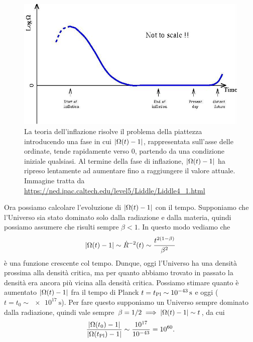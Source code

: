 \begin{figure}
  \centering
  \includegraphics[width=\textwidth]{figure/flatness}
  \caption[Come l'inflazione risolve il problema della piattezza]{La teoria
    dell'inflazione risolve il problema della piattezza introducendo una fase in
    cui \(\lvert\Omega(t) - 1\rvert\), rappresentata sull'asse delle ordinate, tende
    rapidamente verso \(0\), partendo da una condizione iniziale qualsiasi.  Al
    termine della fase di inflazione, \(\lvert\Omega(t) - 1\rvert\) ha ripreso
    lentamente ad aumentare fino a raggiungere il valore attuale.  Immagine
    tratta da \url{https://ned.ipac.caltech.edu/level5/Liddle/Liddle4_1.html}}
  \label{fig:piattezza}
\end{figure}
Ora possiamo calcolare l'evoluzione di \(\lvert\Omega(t) - 1\rvert\) con il tempo.
Supponiamo che l'Universo sia stato dominato solo dalla radiazione e dalla
materia, quindi possiamo assumere che risulti sempre \(\beta < 1\).  In questo
modo vediamo che
\begin{equation}
  \label{eq:omega-t}
  \lvert\Omega(t) - 1\rvert \sim \dot{R}^{-2}(t) \sim \frac{t^{2(1-\beta)}}{\beta^{2}}
\end{equation}
è una funzione crescente col tempo.  Dunque, oggi l'Universo ha una densità
prossima alla densità critica, ma per quanto abbiamo trovato in passato la
densità era ancora più vicina alla densità critica.  Possiamo stimare quanto è
aumentato \(\lvert\Omega(t) - 1\rvert\) fra il tempo di Planck \(t = t_{\textup{Pl}}
\sim \SI{e-43}{\second}\) e oggi (\(t = t_{0} \sim \SI{e17}{\second}\)).  Per
fare questo supponiamo un Universo sempre dominato dalla radiazione, quindi vale
sempre \(\beta = 1/2 \implies \lvert\Omega(t) - 1\rvert \sim t\), da cui
\begin{equation}
  \frac{\lvert\Omega(t_{0}) - 1\rvert}{\lvert\Omega(t_{\textup{Pl}}) - 1\rvert} \sim
  \frac{10^{17}}{10^{-43}} = 10^{60}.
\end{equation}
